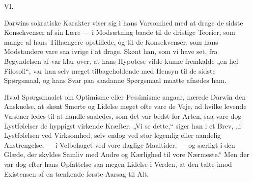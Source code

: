 \documentclass[12pt,a4paper,openany]{book}
\begin{document}
\begin{center}VI.\end{center}


Darwins sokratiske Karakter viser sig i hans Varsomhed
med at drage de sidste Konsekvenser af sin Lære --- i Modsætning
baade til de dristige Teorier, som mange af hans Tilhængere
opstillede, og til de Konsekvenser, som hans Modstandere
vare saa ivrige i at drage. Skønt han, som vi have set, fra
Begyndelsen af var klar over, at hans Hypotese vilde kunne
fremkalde „en hel Filosofi“, var han selv meget tilbageholdende
med Hensyn til de sidste Spørgsmaal, og hans Svar paa saadanne
Spørgsmaal maatte afnødes ham.

Hvad Spørgsmaalet om Optimisme eller Pessimisme angaar,
nærede Darwin den Anskuelse, at skønt Smerte og Lidelse
meget ofte vare de Veje, ad hvilke levende Væsener ledes til
at handle saaledes, som det var bedst for Arten, saa vare dog
Lystfølelser de hyppigst virkende Kræfter. „Vi se dette,“ siger
han i et Brev, „i Lystfølelsen ved Virksomhed, selv endog ved
stor legemlig eller aandelig Anstrengelse, --- i Velbehaget ved
vore daglige Maaltider, --- og særligt i den Glæde, der skyldes
Samliv med Andre og Kærlighed til vore Nærmeste.“ Men
der var dog efter hans Opfattelse saa megen Lidelse i Verden,
at den talte imod Existensen af en tænkende første Aarsag
til Alt.
\end{document}
